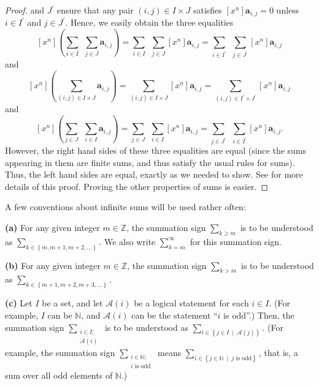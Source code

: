 \begin{proof}
and $J^{\prime}$ ensure that any pair $\left(  i,j\right)  \in I\times J$
satisfies $\left[  x^{n}\right]  \mathbf{a}_{i,j}=0$ unless $i\in I^{\prime}$
and $j\in J^{\prime}$. Hence, we easily obtain the three equalities%
\[
\left[  x^{n}\right]  \left(  \sum_{i\in I}\ \ \sum_{j\in J}\mathbf{a}%
_{i,j}\right)  =\sum_{i\in I}\ \ \sum_{j\in J}\left[  x^{n}\right]
\mathbf{a}_{i,j}=\sum_{i\in I^{\prime}}\ \ \sum_{j\in J^{\prime}}\left[
x^{n}\right]  \mathbf{a}_{i,j}%
\]
and%
\[
\left[  x^{n}\right]  \left(  \sum_{\left(  i,j\right)  \in I\times
J}\mathbf{a}_{i,j}\right)  =\sum_{\left(  i,j\right)  \in I\times J}\left[
x^{n}\right]  \mathbf{a}_{i,j}=\sum_{\left(  i,j\right)  \in I^{\prime}\times
J^{\prime}}\left[  x^{n}\right]  \mathbf{a}_{i,j}%
\]
and%
\[
\left[  x^{n}\right]  \left(  \sum_{j\in J}\ \ \sum_{i\in I}\mathbf{a}%
_{i,j}\right)  =\sum_{j\in J}\ \ \sum_{i\in I}\left[  x^{n}\right]
\mathbf{a}_{i,j}=\sum_{j\in J^{\prime}}\ \ \sum_{i\in I^{\prime}}\left[
x^{n}\right]  \mathbf{a}_{i,j}.
\]
However, the right hand sides of these three equalities are equal (since the
sums appearing in them are finite sums, and thus satisfy the usual rules for
sums). Thus, the left hand sides are equal, exactly as we needed to show. See
\cite[proof of Proposition 7.2.11]{19s} for more details of this proof.
Proving the other properties of sums is easier.
\end{proof}

A few conventions about infinite sums will be used rather often:

\begin{convention}
\label{conv.fps.infsum}\textbf{(a)} For any given integer $m\in\mathbb{Z}$,
the summation sign $\sum_{k\geq m}$ is to be understood as $\sum_{k\in\left\{
m,m+1,m+2,\ldots\right\}  }$. We also write $\sum_{k=m}^{\infty}$ for this
summation sign. \medskip

\textbf{(b)} For any given integer $m\in\mathbb{Z}$, the summation sign
$\sum_{k>m}$ is to be understood as $\sum_{k\in\left\{  m+1,m+2,m+3,\ldots
\right\}  }$. \medskip

\textbf{(c)} Let $I$ be a set, and let $\mathcal{A}\left(  i\right)  $ be a
logical statement for each $i\in I$. (For example, $I$ can be $\mathbb{N}$,
and $\mathcal{A}\left(  i\right)  $ can be the statement \textquotedblleft$i$
is odd\textquotedblright.) Then, the summation sign $\sum_{\substack{i\in
I;\\\mathcal{A}\left(  i\right)  }}$ is to be understood as $\sum
_{i\in\left\{  j\in I\ \mid\ \mathcal{A}\left(  j\right)  \right\}  }$. (For
example, the summation sign $\sum_{\substack{i\in\mathbb{N};\\i\text{ is odd}%
}}$ means $\sum_{i\in\left\{  j\in\mathbb{N}\ \mid\ j\text{ is odd}\right\}
}$, that is, a sum over all odd elements of $\mathbb{N}$.)
\end{convention}

